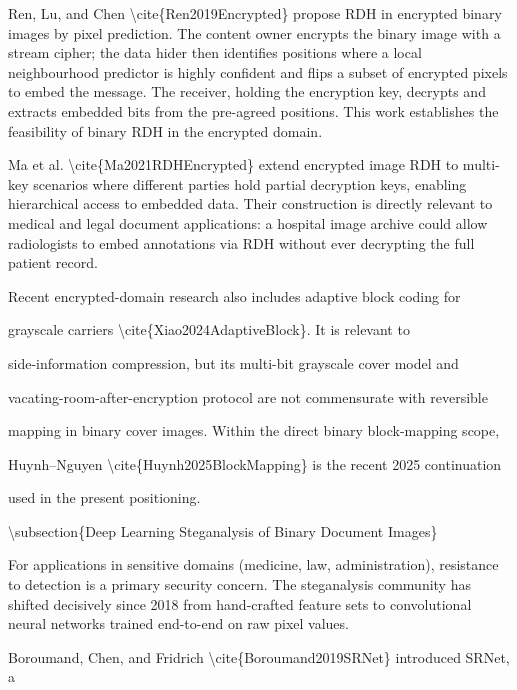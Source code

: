 \documentclass[a4paper,fleqn]{cas-dc}
\newenvironment{RevisionDeletion}{%
  \par\begingroup\color{revisionred}\footnotesize\ttfamily
  \setlength{\parindent}{0pt}\setlength{\parskip}{1pt}\obeyspaces
}{\par\endgroup}
\begin{document}
\begin{RevisionDeletion}
\par
Ren, Lu, and Chen \textbackslash{}cite\{Ren2019Encrypted\} propose RDH in encrypted binary images by pixel prediction. The content owner encrypts the binary image with a stream cipher; the data hider then identifies positions where a local neighbourhood predictor is highly confident and flips a subset of encrypted pixels to embed the message. The receiver, holding the encryption key, decrypts and extracts embedded bits from the pre-agreed positions. This work establishes the feasibility of binary RDH in the encrypted domain.\par
\par
Ma et al. \textbackslash{}cite\{Ma2021RDHEncrypted\} extend encrypted image RDH to multi-key scenarios where different parties hold partial decryption keys, enabling hierarchical access to embedded data. Their construction is directly relevant to medical and legal document applications: a hospital image archive could allow radiologists to embed annotations via RDH without ever decrypting the full patient record.\par
\par
Recent encrypted-domain research also includes adaptive block coding for\par
grayscale carriers \textbackslash{}cite\{Xiao2024AdaptiveBlock\}. It is relevant to\par
side-information compression, but its multi-bit grayscale cover model and\par
vacating-room-after-encryption protocol are not commensurate with reversible\par
mapping in binary cover images. Within the direct binary block-mapping scope,\par
Huynh--Nguyen \textbackslash{}cite\{Huynh2025BlockMapping\} is the recent 2025 continuation\par
used in the present positioning.\par
\par
\textbackslash{}subsection\{Deep Learning Steganalysis of Binary Document Images\}\par
\par
For applications in sensitive domains (medicine, law, administration), resistance to detection is a primary security concern. The steganalysis community has shifted decisively since 2018 from hand-crafted feature sets to convolutional neural networks trained end-to-end on raw pixel values.\par
\par
Boroumand, Chen, and Fridrich \textbackslash{}cite\{Boroumand2019SRNet\} introduced SRNet, a\par

\end{RevisionDeletion}
\end{document}
